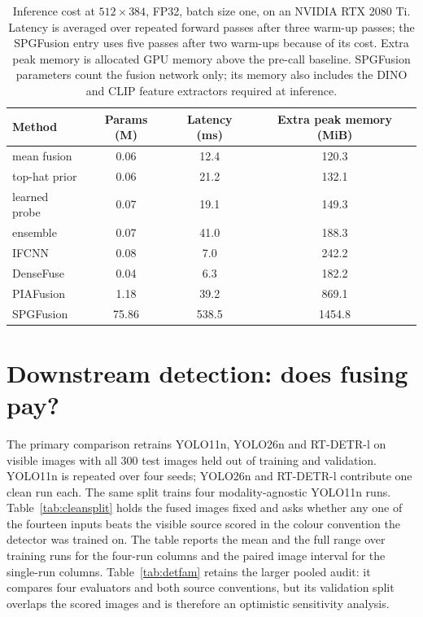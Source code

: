 \documentclass[preprint,10pt]{elsarticle}
\begin{document}
\begin{sloppypar}
\begin{table}[!t]
\caption{Inference cost at $512\times384$, FP32, batch size one, on an NVIDIA
RTX 2080 Ti. Latency is averaged over repeated forward passes after three warm-up passes;
the SPGFusion entry uses five passes after two warm-ups because of its cost. Extra peak
memory is allocated GPU memory above the pre-call baseline. SPGFusion parameters count
the fusion network only; its memory also includes the DINO and CLIP feature extractors
required at inference.}\label{tab:cost}
\setlength{\tabcolsep}{4pt}
\begin{tabular*}{\linewidth}{@{\extracolsep{\fill}}l SSS@{}}
\toprule
Method & {Params (M)} & {Latency (ms)} & {Extra peak memory (MiB)}\\
\midrule
mean fusion & 0.06 & 12.4 & 120.3\\
top-hat prior & 0.06 & 21.2 & 132.1\\
learned probe & 0.07 & 19.1 & 149.3\\
ensemble & 0.07 & 41.0 & 188.3\\
IFCNN~\cite{zhang2020} & 0.08 & 7.0 & 242.2\\
DenseFuse~\cite{li2019} & 0.04 & 6.3 & 182.2\\
PIAFusion~\cite{tang2022} & 1.18 & 39.2 & 869.1\\
SPGFusion~\cite{zhang2026} & 75.86 & 538.5 & 1454.8\\
\bottomrule
\end{tabular*}

\end{table}
\end{sloppypar}

\section{Downstream detection: does fusing pay?}
\label{sec:detect}

The primary comparison retrains YOLO11n, YOLO26n and RT-DETR-l on visible images with
all 300 test images held out of training and validation. YOLO11n is repeated over four
seeds; YOLO26n and RT-DETR-l contribute one clean run each. The same split trains four
modality-agnostic YOLO11n runs. Table~\ref{tab:cleansplit} holds the fused images fixed
and asks whether any one of the fourteen inputs beats the visible source scored in the
colour convention the detector was trained on. The table reports the mean and the full
range over training runs for the four-run columns and the paired image interval for
the single-run columns. Table~\ref{tab:detfam} retains the larger pooled audit: it compares four
evaluators and both source conventions, but its validation split overlaps the scored
images and is therefore an optimistic sensitivity analysis.
\end{document}
